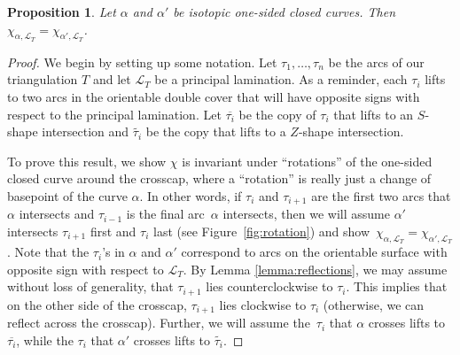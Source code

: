 \documentclass[10pt,a4paper]{amsart}
\numberwithin{equation}{section}
\newtheorem{Proposition}[Theorem]{Proposition}
\theoremstyle{definition}
\begin{document}
\begin{Proposition}\label{prop:rotation}
 Let $\alpha$ and $\alpha'$ be isotopic one-sided closed curves. Then $\chi_{\alpha, \mathcal{L}_T}=\chi_{\alpha', \mathcal{L}_T}$.
\end{Proposition}
\begin{proof}
 We begin by setting up some notation. Let $\tau_1, \ldots, \tau_n$ be the arcs of our triangulation $T$ and let $\mathcal{L}_T$ be a principal lamination. As a reminder, each $\tau_i$ lifts to two arcs in the orientable double cover that will have opposite signs with respect to the principal lamination. Let $\overline{\tau_i}$ be the copy of $\tau_i$ that lifts to an $S$-shape intersection and $\widetilde{\tau_i}$ be the copy that lifts to a $Z$-shape intersection.

 To prove this result, we show $\chi$ is invariant under ``rotations'' of the one-sided closed curve around the crosscap, where a ``rotation'' is really just a change of basepoint of the curve $\alpha$. In other words, if $\tau_i$ and $\tau_{i+1}$ are the first two arcs that $\alpha$ intersects and $\tau_{i-1}$ is the final arc~$\alpha$ intersects, then we will assume $\alpha'$ intersects $\tau_{i+1}$ first and $\tau_{i}$ last (see Figure~\ref{fig:rotation}) and show~${\chi_{\alpha, \mathcal{L}_T}=\chi_{\alpha', \mathcal{L}_T}}$. Note that the $\tau_i$'s in $\alpha$ and $\alpha'$ correspond to arcs on the orientable surface with opposite sign with respect to $\mathcal{L}_T$. By Lemma \ref{lemma:reflections}, we may assume without loss of generality, that $\tau_{i+1}$ lies counterclockwise to $\tau_{i}$. This implies that on the other side of the crosscap, $\tau_{i+1}$ lies clockwise to $\tau_{i}$ (otherwise, we can reflect across the crosscap). Further, we will assume the~$\tau_i$ that $\alpha$ crosses lifts to $\overline{\tau_i}$, while the $\tau_i$ that $\alpha'$ crosses lifts to $\widetilde{\tau_i}$.


\end{proof}
\end{document}

